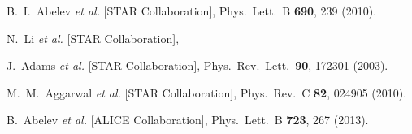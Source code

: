 \documentclass[aps,prc,nofootinbib,showpacs,superscriptaddress,groupedaddress]{revtex4-1}
\begin{document}
\begin{thebibliography}{99}
  B.~I.~Abelev {\it et al.} [STAR Collaboration],
  Phys.\ Lett.\ B {\bf 690}, 239 (2010).

  N.~Li {\it et al.} [STAR Collaboration],

  J.~Adams {\it et al.} [STAR Collaboration],
  Phys.\ Rev.\ Lett.\  {\bf 90}, 172301 (2003).
   
  M.~M.~Aggarwal {\it et al.} [STAR Collaboration],
  Phys.\ Rev.\ C {\bf 82}, 024905 (2010).


  B.~Abelev {\it et al.} [ALICE Collaboration],
  Phys.\ Lett.\ B {\bf 723}, 267 (2013).
  

\end{thebibliography}
\end{document}
